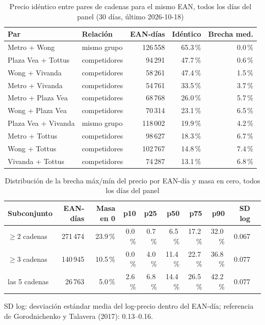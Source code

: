 
\begin{table}[htbp]
\caption{Precio id\'entico entre pares de cadenas para el mismo EAN, todos los d\'ias del panel (30 d\'ias, \'ultimo 2026-10-18)}
\label{tab:identidad}
\centering\scriptsize\setlength{\tabcolsep}{3pt}
\begin{tabular}{@{}llrrr@{}}
\toprule
Par & Relaci\'on & EAN-d\'ias & Id\'entico & Brecha med. \\
\midrule
Metro + Wong & mismo grupo & 126\,558 & 65.3\,\% & 0.0\,\% \\
Plaza Vea + Tottus & competidores & 94\,291 & 47.7\,\% & 0.6\,\% \\
Wong + Vivanda & competidores & 58\,261 & 47.4\,\% & 1.5\,\% \\
Metro + Vivanda & competidores & 54\,761 & 33.5\,\% & 3.7\,\% \\
Metro + Plaza Vea & competidores & 68\,768 & 26.0\,\% & 5.7\,\% \\
Wong + Plaza Vea & competidores & 70\,314 & 23.1\,\% & 6.5\,\% \\
Plaza Vea + Vivanda & mismo grupo & 118\,002 & 19.9\,\% & 4.2\,\% \\
Metro + Tottus & competidores & 98\,627 & 18.3\,\% & 6.7\,\% \\
Wong + Tottus & competidores & 102\,767 & 14.8\,\% & 7.4\,\% \\
Vivanda + Tottus & competidores & 74\,287 & 13.1\,\% & 6.8\,\% \\
\bottomrule\end{tabular}\end{table}

\begin{table}[t]
\caption{Distribuci\'on de la brecha m\'ax/m\'in del precio por EAN-d\'ia y masa en cero, todos los d\'ias del panel}
\label{tab:brecha}
\centering\scriptsize\setlength{\tabcolsep}{4pt}
\begin{tabular}{@{}lrrrrrrrrr@{}}
\toprule
Subconjunto & EAN-d\'ias & Masa en 0 & p10 & p25 & p50 & p75 & p90 & SD log \\
\midrule
$\geq 2$ cadenas & 271\,474 & 23.9\,\% & 0.0\,\% & 0.7\,\% & 6.5\,\% & 17.2\,\% & 32.0\,\% & 0.067 \\
$\geq 3$ cadenas & 140\,945 & 10.5\,\% & 0.0\,\% & 4.0\,\% & 11.4\,\% & 22.7\,\% & 36.8\,\% & 0.077 \\
las 5 cadenas & 26\,763 & 5.0\,\% & 2.6\,\% & 6.8\,\% & 14.4\,\% & 26.5\,\% & 42.2\,\% & 0.077 \\
\bottomrule\end{tabular}
\par\smallskip\raggedright\scriptsize SD log: desviaci\'on est\'andar media del log-precio dentro del EAN-d\'ia; referencia de Gorodnichenko y Talavera (2017): 0.13--0.16.
\end{table}

